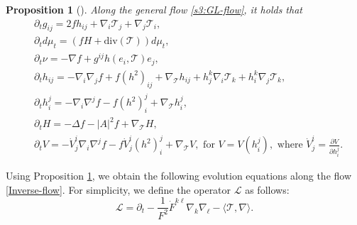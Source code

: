\documentclass[11pt,reqno]{amsart}
\newtheorem{prop}[thm]{Proposition}
\theoremstyle{definition}
\theoremstyle{remark}
\numberwithin{equation}{section}
\renewcommand{\(}{\left(}
\renewcommand{\)}{\right)}
\renewcommand{\-}{\overline}
\begin{document}
\begin{prop}[\cite{Weng-Xia2022}]\label{Prop-general-evo}
	Along the general flow \eqref{s3:GL-flow}, it holds that
	\begin{align}
		&\partial_t{g_{ij}}=2f h_{ij}+\nabla_i \mathcal{T}_j+\nabla_j \mathcal{T}_i,\label{ev-metric}\\
		&\partial_t d\mu_t=(fH+\mathrm{div}(\mathcal{T}))d\mu_t,\label{ev-area}\\
		&\partial_t\nu=-\nabla f+g^{ij}h(e_i,\mathcal{T})e_j,\label{ev-normal}\\
		&\partial_t h_{ij}=-\nabla_i\nabla_j f+f(h^2)_{ij}+\nabla_\mathcal{T}{h_{ij}}+h_j^k\nabla_i{\mathcal{T}_k}+h_i^k\nabla_j{\mathcal{T}_k},\label{ev-sfn}\\
		&\partial_t h_i^j=-\nabla_i\nabla^j f-f(h^2)_i^j+\nabla_\mathcal{T} h_i^j,\label{ev-Wg}\\
		&\partial_t H=-\Delta f-|A|^2 f+\nabla_\mathcal{T}{H},\label{ev-H}\\
		&\partial_t V=-\dot{V}_j^i\nabla_i\nabla^j f-f \dot{V}_j^i(h^2)_i^j+\nabla_\mathcal{T}{V},\,\,\text{for}\,\, V=V(h_i^j),\,\,\text{where}\,\, \dot{V}_j^i=\frac{\partial V}{\partial h_i^j}. \label{ev-F}
	\end{align}
\end{prop}

Using Proposition \ref{Prop-general-evo}, we obtain the following evolution equations along the flow \eqref{Inverse-flow}. For simplicity, we define the operator $\mathcal{L}$ as follows:
\begin{equation*}
	\mathcal{L}=\partial_t-\frac{1}{F^2}\dot{F}^{k\ell}\nabla_k\nabla_{\ell}-\langle \mathcal{T},\nabla \rangle.
\end{equation*}
\end{document}
